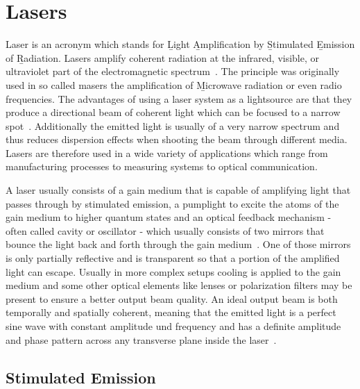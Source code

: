 \documentclass[a4paper,10pt]{article}
\begin{document}
    \newpage

    \section{Lasers}

    Laser is an acronym which stands for \b{L}ight \b{A}mplification
    by \b{S}timulated \b{E}mission of \b{R}adiation.
    Lasers amplify coherent radiation at the infrared, visible, or
    ultraviolet part of the electromagnetic spectrum~\cite{lasers_siegman}.
    The principle was originally used in so called masers the 
    amplification of \b{M}icrowave radiation or even radio frequencies.
    The advantages of using a laser system as a lightsource are that
    they produce a directional beam of coherent light which can be 
    focused to a narrow spot~\cite{lasers_liverpool}.
    Additionally the emitted light is usually of a very narrow spectrum
    and thus reduces dispersion effects when shooting the beam through
    different media.
    Lasers are therefore used in a wide variety of applications which
    range from manufacturing processes to measuring systems to 
    optical communication.

    A laser usually consists of a gain medium that is capable of amplifying
    light that passes through by stimulated emission, a pumplight to
    excite the atoms of the gain medium to higher quantum states and
    an optical feedback mechanism - often called cavity or oscillator - 
    which usually
    consists of two mirrors that bounce the light back and forth through
    the gain medium~\cite{lasers_siegman}.
    One of those mirrors is only partially reflective and is transparent
    so that a portion of the amplified light can escape.
    Usually in more complex setups cooling is applied to the gain medium
    and some other optical elements like
    lenses or polarization filters may be present to ensure a better
    output beam quality.
    An ideal output beam is both temporally and spatially coherent,
    meaning that the emitted light is a perfect sine wave with constant
    amplitude und frequency and has a definite amplitude and phase pattern
    across any transverse plane inside the laser~\cite{lasers_siegman}.

    \subsection{Stimulated Emission}
\end{document}
